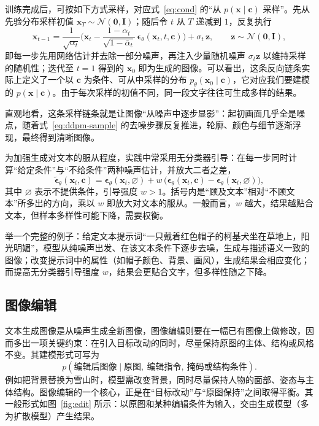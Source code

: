 训练完成后，可按如下方式采样，对应式~\eqref{eq:cond} 的“从 $p(\mathbf{x}\mid\mathbf{c})$ 采样”。先从先验分布采样初值 $\mathbf{x}_T\sim\mathcal{N}(\mathbf{0},\mathbf{I})$；随后令 $t$ 从 $T$ 递减到 $1$，反复执行
\begin{equation}
  \mathbf{x}_{t-1}=\frac{1}{\sqrt{\alpha_t}}\Big(\mathbf{x}_t-\frac{1-\alpha_t}{\sqrt{1-\bar\alpha_t}}\,\boldsymbol{\epsilon}_\theta(\mathbf{x}_t,t,\mathbf{c})\Big)+\sigma_t\,\mathbf{z},\qquad \mathbf{z}\sim\mathcal{N}(\mathbf{0},\mathbf{I}),
  \label{eq:ddpm-sample}
\end{equation}
即每一步先用网络估计并去除一部分噪声，再注入少量随机噪声 $\sigma_t\mathbf{z}$ 以维持采样的随机性；迭代至 $t=1$ 得到的 $\mathbf{x}_0$ 即为生成的图像。可以看出，这条反向链条实际上定义了一个以 $\mathbf{c}$ 为条件、可从中采样的分布 $p_\theta(\mathbf{x}_0\mid\mathbf{c})$，它对应我们要建模的 $p(\mathbf{x}\mid\mathbf{c})$。由于每次采样的初值不同，同一段文字往往可生成多样的结果。

直观地看，这条采样链条就是让图像“从噪声中逐步显影”：起初画面几乎全是噪点，随着式~\eqref{eq:ddpm-sample} 的去噪步骤反复推进，轮廓、颜色与细节逐渐浮现，最终得到清晰图像。

为加强生成对文本的服从程度，实践中常采用无分类器引导\cite{cfg}：在每一步同时计算“给定条件”与“不给条件”两种噪声估计，并放大二者之差，
\begin{equation}
  \tilde{\boldsymbol{\epsilon}}_\theta(\mathbf{x}_t,\mathbf{c})=\boldsymbol{\epsilon}_\theta(\mathbf{x}_t,\varnothing)+w\,\big(\boldsymbol{\epsilon}_\theta(\mathbf{x}_t,\mathbf{c})-\boldsymbol{\epsilon}_\theta(\mathbf{x}_t,\varnothing)\big),
  \label{eq:cfg}
\end{equation}
其中 $\varnothing$ 表示不提供条件，引导强度 $w>1$。括号内是“顾及文本”相对“不顾文本”所多出的方向，乘以 $w$ 即放大对文本的服从。一般而言，$w$ 越大，结果越贴合文本，但样本多样性可能下降，需要权衡。

举一个完整的例子：给定文本提示词“一只戴着红色帽子的柯基犬坐在草地上，阳光明媚”，模型从纯噪声出发、在该文本条件下逐步去噪，生成与描述语义一致的图像；改变提示词中的属性（如帽子颜色、背景、画风），生成结果会相应变化；而提高无分类器引导强度 $w$，结果会更贴合文字，但多样性随之下降。

\subsection{图像编辑}
\label{sub:edit}

文本生成图像是从噪声生成全新图像，图像编辑则要在一幅已有图像上做修改，因而多出一项关键约束：在引入目标改动的同时，尽量保持原图的主体、结构或风格不变。其建模形式可写为
\begin{equation}
  p(\text{编辑后图像}\mid \text{原图},\ \text{编辑指令},\ \text{掩码或结构条件}).
\end{equation}
例如把背景替换为雪山时，模型需改变背景，同时尽量保持人物的面部、姿态与主体结构。图像编辑的一个核心，正是在“目标改动”与“原图保持”之间取得平衡。其一般形式如图~\ref{fig:edit} 所示：以原图和某种编辑条件为输入，交由生成模型（多为扩散模型）产生结果。

